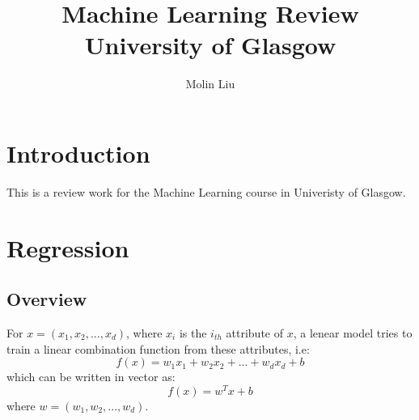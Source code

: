 \documentclass[12pt]{article}
\title{
    Machine Learning Review\\
    \large University of Glasgow
}
\author{Molin Liu}
\begin{document}
\maketitle

\section*{Introduction}

This is a review work for the Machine Learning course in
Univeristy of Glasgow.

\section{Regression}
\subsection{Overview}

For $x = (x_1, x_2, ..., x_d)$, 
where $x_i$ is the $i_{th}$ attribute of $x$, 
a lenear model tries to train a linear combination function
from these attributes, i.e:
$$f(x) = w_1 x_1 + w_2 x_2 +...+ w_d x_d+b$$
which can be written in vector as:
$$f(x)=w^Tx+b$$
where $w=(w_1, w_2,...,w_d)$.
\end{document}

